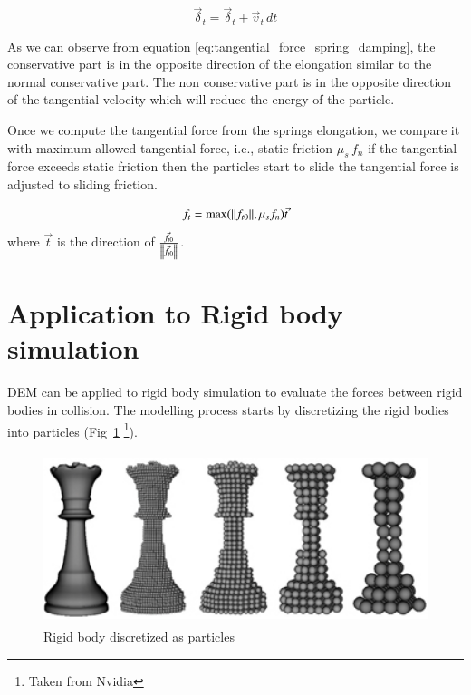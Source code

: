 \begin{equation*}
  \vec{\delta}_t = \vec{\delta}_t + \vec{v}_t \, dt
\end{equation*}

As we can observe from equation \ref{eq:tangential_force_spring_damping},
the conservative part is in the opposite direction of the elongation similar
to the normal conservative part. The non conservative part is in the opposite
direction of the tangential velocity which will reduce the energy of the
particle.

Once we compute the tangential force from the springs elongation, we compare it
with maximum allowed tangential force, i.e., static friction $\mu_s \, f_n$ if
the tangential force exceeds static friction then the particles start to slide
the tangential force is adjusted to sliding friction.

\begin{equation}
  \label{eq:tangential_force_spring_damping}
  f_t = \max(\norm{f_{t0}}, \mu_s f_n) \vec{t}
\end{equation}
where $\vec{t}$ is the direction of $\frac{\vec{f}_{t0}}{\norm{\vec{f}_{t0}}}$.



\section{Application to Rigid body simulation}
\label{sec:appl-rigid-body}

DEM can be applied to rigid body simulation to evaluate the forces between rigid
bodies in collision. The modelling process starts by discretizing the rigid
bodies into particles (Fig~\ref{fig:rigid_body_particles} \footnote{Taken from Nvidia}).


\begin{figure}
  \centering
  \includegraphics[width=0.9\linewidth, height=5cm]{dem/doc_images/grid_to_particles}
  \caption{Rigid body discretized as particles}
  \label{fig:rigid_body_particles}
\end{figure}


